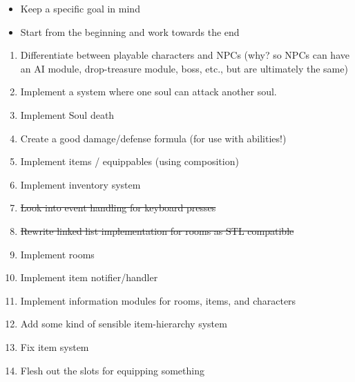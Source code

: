 \documentclass{article}
\begin{document}
\begin{itemize}
    \item Keep a specific goal in mind 
    \item Start from the beginning and work towards the end
\end{itemize}

\hline

\begin{enumerate}
    \item Differentiate between playable characters and NPCs (why?
        so NPCs can have an AI module, drop-treasure module, boss,
        etc., but are ultimately the same)
    \item Implement a system where one soul can attack another soul. \checkmark
    \item Implement Soul death
    \item Create a good damage/defense formula (for use with abilities!)
    \item Implement items / equippables (using composition) \checkmark
    \item Implement inventory system \checkmark
    \item \sout{Look into event handling for keyboard presses}
    \item \sout{Rewrite linked list implementation for rooms as STL compatible}
    \item Implement rooms \checkmark
    \item Implement item notifier/handler \checkmark
    \item Implement information modules for rooms, items, and characters \checkmark
    \item Add some kind of sensible item-hierarchy system \checkmark
    \item Fix item system \checkmark
    \item Flesh out the slots for equipping something
\end{enumerate}
\end{document}
